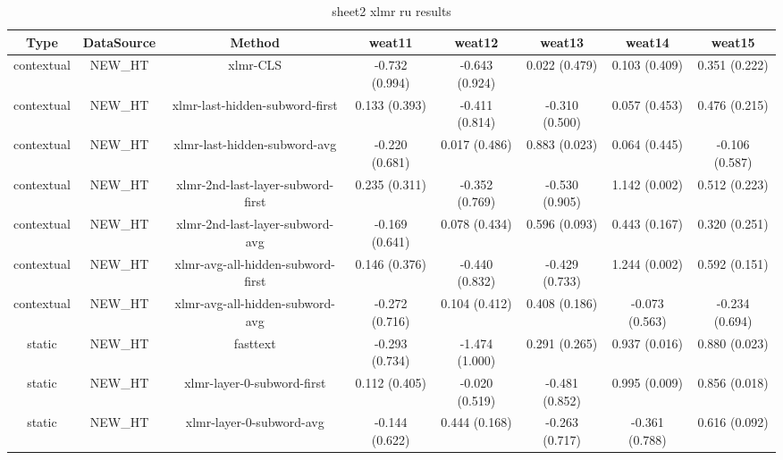 \begin{sidewaystable}[htb]
    \centering
    \caption{sheet2 xlmr ru results}
    \label{appendix_tab:sheet2_xlmr_ru_results}
    \small
    \begin{tabular}{@{}cccccccc@{}}
        \toprule
        Type & DataSource & Method & weat11 & weat12 & weat13 & weat14 & weat15 \\
        \midrule
        contextual & NEW\_HT & xlmr-CLS & -0.732 (0.994) & -0.643 (0.924) & 0.022 (0.479) & 0.103 (0.409) & 0.351 (0.222) \\
        contextual & NEW\_HT & xlmr-last-hidden-subword-first & 0.133 (0.393) & -0.411 (0.814) & -0.310 (0.500) & 0.057 (0.453) & 0.476 (0.215) \\
        contextual & NEW\_HT & xlmr-last-hidden-subword-avg & -0.220 (0.681) & 0.017 (0.486) & 0.883 (0.023) & 0.064 (0.445) & -0.106 (0.587) \\
        contextual & NEW\_HT & xlmr-2nd-last-layer-subword-first & 0.235 (0.311) & -0.352 (0.769) & -0.530 (0.905) & 1.142 (0.002) & 0.512 (0.223) \\
        contextual & NEW\_HT & xlmr-2nd-last-layer-subword-avg & -0.169 (0.641) & 0.078 (0.434) & 0.596 (0.093) & 0.443 (0.167) & 0.320 (0.251) \\
        contextual & NEW\_HT & xlmr-avg-all-hidden-subword-first & 0.146 (0.376) & -0.440 (0.832) & -0.429 (0.733) & 1.244 (0.002) & 0.592 (0.151) \\
        contextual & NEW\_HT & xlmr-avg-all-hidden-subword-avg & -0.272 (0.716) & 0.104 (0.412) & 0.408 (0.186) & -0.073 (0.563) & -0.234 (0.694) \\
        static & NEW\_HT & fasttext & -0.293 (0.734) & -1.474 (1.000) & 0.291 (0.265) & 0.937 (0.016) & 0.880 (0.023) \\
        static & NEW\_HT & xlmr-layer-0-subword-first & 0.112 (0.405) & -0.020 (0.519) & -0.481 (0.852) & 0.995 (0.009) & 0.856 (0.018) \\
        static & NEW\_HT & xlmr-layer-0-subword-avg & -0.144 (0.622) & 0.444 (0.168) & -0.263 (0.717) & -0.361 (0.788) & 0.616 (0.092) \\
        \bottomrule
    \end{tabular}
\end{sidewaystable}